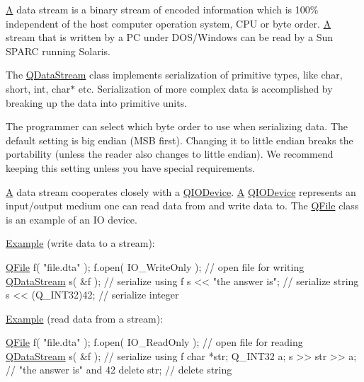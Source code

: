 \hyperlink{class_a}{A} data stream is a binary stream of encoded information which is 100\% independent of the host computer operation system, C\-P\-U or byte order. \hyperlink{class_a}{A} stream that is written by a P\-C under D\-O\-S/\-Windows can be read by a Sun S\-P\-A\-R\-C running Solaris.

The \hyperlink{class_q_data_stream}{Q\-Data\-Stream} class implements serialization of primitive types, like {\ttfamily char}, {\ttfamily short}, {\ttfamily int}, {\ttfamily char$\ast$} etc. Serialization of more complex data is accomplished by breaking up the data into primitive units.

The programmer can select which byte order to use when serializing data. The default setting is big endian (M\-S\-B first). Changing it to little endian breaks the portability (unless the reader also changes to little endian). We recommend keeping this setting unless you have special requirements.

\hyperlink{class_a}{A} data stream cooperates closely with a \hyperlink{class_q_i_o_device}{Q\-I\-O\-Device}. \hyperlink{class_a}{A} \hyperlink{class_q_i_o_device}{Q\-I\-O\-Device} represents an input/output medium one can read data from and write data to. The \hyperlink{class_q_file}{Q\-File} class is an example of an I\-O device.

\hyperlink{struct_example}{Example} (write data to a stream)\-: 
\begin{DoxyCode}
\hyperlink{class_q_file}{QFile} f( \textcolor{stringliteral}{"file.dta"} );
f.open( IO\_WriteOnly );           \textcolor{comment}{// open file for writing}
\hyperlink{class_q_data_stream}{QDataStream} s( &f );          \textcolor{comment}{// serialize using f}
s << \textcolor{stringliteral}{"the answer is"};         \textcolor{comment}{// serialize string}
s << (Q\_INT32)42;             \textcolor{comment}{// serialize integer}
\end{DoxyCode}


\hyperlink{struct_example}{Example} (read data from a stream)\-: 
\begin{DoxyCode}
\hyperlink{class_q_file}{QFile} f( \textcolor{stringliteral}{"file.dta"} );
f.open( IO\_ReadOnly );            \textcolor{comment}{// open file for reading}
\hyperlink{class_q_data_stream}{QDataStream} s( &f );          \textcolor{comment}{// serialize using f}
\textcolor{keywordtype}{char}   *str;
Q\_INT32 a;
s >> str >> a;                \textcolor{comment}{// "the answer is" and 42}
\textcolor{keyword}{delete} str;                   \textcolor{comment}{// delete string}
\end{DoxyCode}


